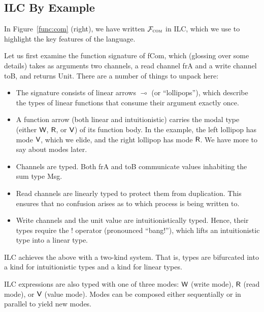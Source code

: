 \subsection{ILC By Example}
\label{subsec:ilc-flavored}

In Figure~\ref{func:com} (right), we have written $\mathcal{{F}}_{\textsc{com}}$ in ILC,
which we use to highlight the key features of the language. \smallskip

 Let us first examine the function signature of
\textsf{fCom}, which (glossing over some details) takes as arguments two
channels, a read channel \textsf{frA} and a write channel \textsf{toB}, and
returns \textsf{Unit}. There are a number of things to unpack here:

\begin{itemize}[leftmargin=*]
  \item The signature consists of linear arrows $\multimap$ (or ``lollipops''), which
    describe the types of linear functions that consume their argument exactly
    once.
  \item A function arrow (both linear and intuitionistic) carries the modal type
    (either $\textsf{W}$, $\textsf{R}$, or $\textsf{V}$) of its function body. In the example, the
    left lollipop has mode $\textsf{V}$, which we elide, and the right lollipop has
    mode $\textsf{R}$. We have more to say about modes later.
  \item Channels are typed. Both \textsf{frA} and \textsf{toB} communicate
    values inhabiting the sum type \textsf{Msg}.
  \item Read channels are linearly typed to protect them from duplication. This
    ensures that no confusion arises as to which process is being written to.
  \item Write channels and the unit value are intuitionistically typed. Hence,
    their types require the ! operator (pronounced ``bang!''), which lifts an
    intuitionistic type into a linear type.
\end{itemize}

\noindent ILC achieves the above with a two-kind system. That is, types are
bifurcated into a kind for intuitionistic types and a kind for linear
types.\smallskip

 ILC expressions are also typed with one of three modes:
$\textsf{W}$ (write mode), $\textsf{R}$ (read mode), or $\textsf{V}$ (value mode). Modes can be
composed either sequentially or in parallel to yield new modes.

